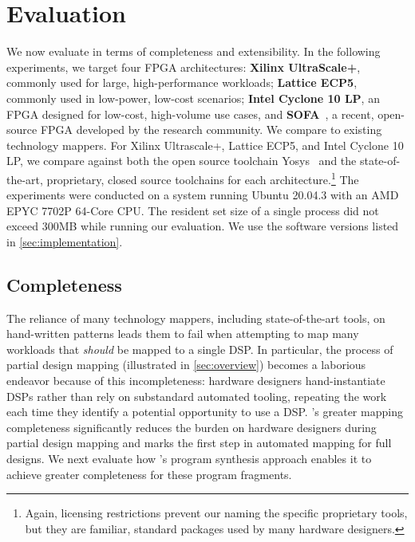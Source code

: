 \section{Evaluation}
\label{sec:evaluation}

We now evaluate
  \lr in terms of completeness
  and extensibility.
In the following experiments,
  we target four FPGA architectures:
  \textbf{Xilinx UltraScale+},
  commonly used
  for large, high-performance workloads;
  \textbf{Lattice ECP5},
  commonly used 
  in low-power, low-cost scenarios;
  \textbf{Intel Cyclone 10 LP},
  an FPGA designed for low-cost,
  high-volume use cases,
  and 
  \textbf{SOFA}~\cite{sofa},
  a recent, open-source
  FPGA developed by the
  research community.
We compare \lr to existing
  technology mappers.
For
  Xilinx Ultrascale+, Lattice ECP5, and
  Intel Cyclone 10 LP,
  we compare \lr against both
  the open source toolchain Yosys~\cite{wolf2013yosys}
  and the
  state-of-the-art,
  proprietary, closed source
  toolchains
  for each architecture.\footnote{
    Again, licensing restrictions 
    prevent our naming the specific 
    proprietary tools, but
    they are familiar, standard packages 
    used by many hardware designers.}\tighten
The experiments were conducted 
  on a system running Ubuntu 20.04.3 
  with an AMD EPYC 7702P 64-Core CPU.
The resident set size of a single \lr process
  did not exceed
  300MB while running our evaluation.
We use the software versions listed in \cref{sec:implementation}.

\subsection{\lr Completeness}
\label{sec:completeness}
% 
% 
The reliance of many technology mappers,
  including state-of-the-art tools,
  on hand-written patterns
  leads them to fail when attempting to map many workloads
  that \textit{should} be mapped to a single DSP.
In particular, 
  the process of partial
  design mapping 
  (illustrated in \cref{sec:overview}) 
  becomes
  a laborious endeavor because
  of this incompleteness:
  hardware designers
  hand-instantiate DSPs rather
  than rely on substandard
  automated tooling, repeating
  the work each time they identify a potential
  opportunity to use a DSP.
\lr's greater mapping completeness 
  significantly
  reduces the burden on hardware
  designers during partial
  design mapping and marks 
  the first step in automated
  mapping for full designs.
  We next evaluate how \lr's program synthesis approach
  enables it to achieve greater completeness
  for these program fragments.
  
